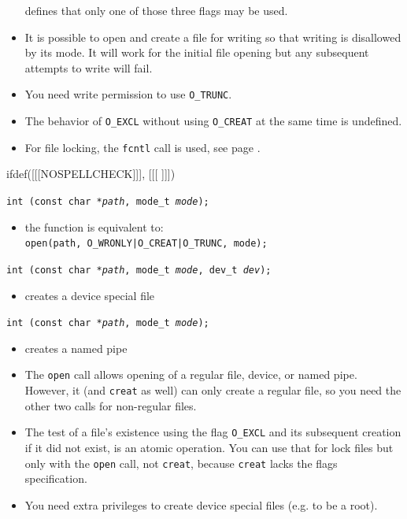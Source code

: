 \begin{itemize}
defines that only one of those three flags may be used.
\item It is possible to open and create a file for writing so that writing is
disallowed by its mode.  It will work for the initial file opening but any
subsequent attempts to write will fail.
\item You need write permission to use \texttt{O\_TRUNC}.
\item The behavior of \texttt{O\_EXCL} without using \texttt{O\_CREAT} at the
same time is undefined.
\item For file locking, the \texttt{fcntl} call is used, see page
\pageref{FCNTL}.
\end{itemize}


ifdef([[[NOSPELLCHECK]]], [[[
]]])

\begin{slide}
\texttt{int (const char *\emph{path}, mode\_t \emph{mode});}
\begin{itemize}
\item the function is equivalent to:\\
\texttt{open(path, O\_WRONLY|O\_CREAT|O\_TRUNC, mode);}
\end{itemize}
\texttt{int (const char *\emph{path}, mode\_t \emph{mode},
dev\_t \emph{dev});}
\begin{itemize}
\item creates a device special file
\end{itemize}
\texttt{int (const char *\emph{path}, mode\_t \emph{mode});} 
\begin{itemize}
\item creates a named pipe
\end{itemize}
\end{slide}

\label{MKFIFO}
\label{CREAT}

\begin{itemize}
\item The \texttt{open} call allows opening of a regular file, device, or named
pipe.  However, it (and \texttt{creat} as well) can only create a regular file,
so you need the other two calls for non-regular files.
\item The test of a file's existence using the flag \texttt{O\_EXCL} and its
subsequent creation if it did not exist, is an atomic operation.  You can use
that for lock files but only with the \texttt{open} call, not \texttt{creat},
because \texttt{creat} lacks the flags specification.
\item You need extra privileges to create device special files (e.g. to be a
root).
\end{itemize}

